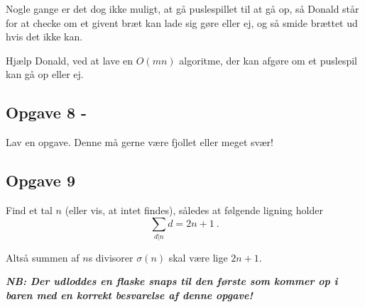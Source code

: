 Nogle gange er det dog ikke muligt, at gå puslespillet til at gå op, så
Donald står for at checke om et givent bræt kan lade sig gøre eller ej, og
så smide brættet ud hvis det ikke kan.

Hjælp Donald, ved at lave en $O(mn)$ algoritme, der kan afgøre om et puslespil
kan gå op eller ej.



\subsection{Opgave 8 - \color{red}{TODO!}}
Lav en opgave. Denne må gerne være fjollet eller meget svær!


\subsection{Opgave 9}

Find et tal $n$ (eller vis, at intet findes), således at følgende ligning
holder
\[
    \sum_{d|n} d = 2n + 1\ .
\]

Altså summen af $n$s divisorer $\sigma(n)$ skal være lige $2n+1$.


\textbf{\emph{NB: Der udloddes en flaske snaps til den første som kommer op i baren med en korrekt besvarelse af denne opgave!}}

